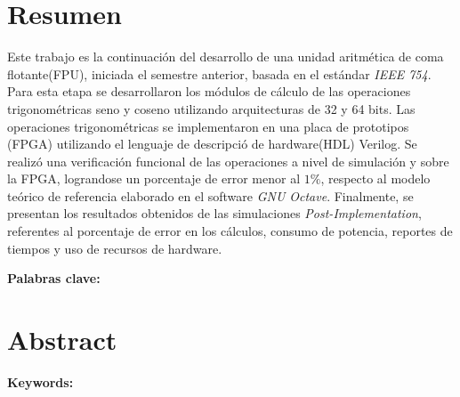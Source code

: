 \chapter*{Resumen}
Este trabajo es la continuación del desarrollo de una unidad aritmética de coma flotante(FPU), iniciada el semestre anterior, basada en el estándar \textit{IEEE 754}. Para esta etapa se desarrollaron los módulos de cálculo de las operaciones trigonométricas seno y coseno utilizando arquitecturas de 32 y 64 bits. Las operaciones trigonométricas se implementaron en una placa de prototipos (FPGA) utilizando el lenguaje de descripció de hardware(HDL) Verilog. Se realizó una verificación funcional de las operaciones a nivel de simulación y sobre la FPGA, lograndose un porcentaje de error menor al $ 1\% $, respecto al modelo teórico de referencia elaborado en el software \textit{GNU Octave}. Finalmente, se presentan los resultados obtenidos de las simulaciones \textit{Post-Implementation}, referentes al porcentaje de error en los cálculos, consumo de potencia, reportes de tiempos y uso de recursos de hardware.



\bigskip

\textbf{Palabras clave:} \scriptKeywords

\clearpage
\chapter*{Abstract}
\thispagestyle{empty}



\bigskip

\textbf{Keywords:} \scriptKeywordsEnglish %

\cleardoublepage

